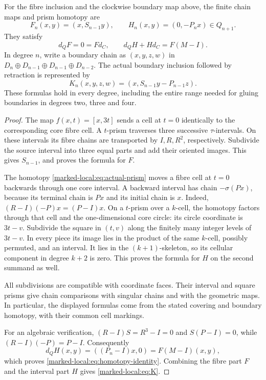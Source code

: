 \begin{theorem}\label{marked-local:thm:maps}
For the fibre inclusion and the clockwise boundary map above, the finite
chain maps and prism homotopy are
\begin{equation}\label{marked-local:eq:F-H}
 F_n(x,y)=(x,S_{n-1}y),\qquad
 H_n(x,y)=(0,-P_nx)\in Q_{n+1}.
\end{equation}
They satisfy
\begin{equation}\label{marked-local:eq:homotopy-identity}
 d_QF=0=Fd_C,\qquad d_QH+Hd_C=F(M-I).
\end{equation}
In degree $n$, write a boundary chain as
$(x,y,z,w)$ in
$D_n\oplus D_{n-1}\oplus D_{n-1}\oplus D_{n-2}$.
The actual boundary inclusion followed by retraction is represented by
\begin{equation}\label{marked-local:eq:K}
 K_n(x,y,z,w)=(x,S_{n-1}y-P_{n-1}z).
\end{equation}
These formulas hold in every degree, including the entire range needed
for gluing boundaries in degrees two, three and four.
\end{theorem}
\begin{proof}
The map $f(x,t)=[x,3t]$ sends a cell at $t=0$ identically to the
corresponding core fibre cell. A $t$-prism traverses three successive
$\tau$-intervals. On these intervals its fibre chains are transported
by $I,R,R^2$, respectively. Subdivide the source interval into three
equal parts and add their oriented images. This gives $S_{n-1}$,
and proves the formula for $F$.

The homotopy \eqref{marked-local:eq:actual-prism} moves a fibre cell at $t=0$
backwards through one core interval. A backward interval has chain
$-\sigma(Px)$, because its terminal chain is $Px$ and its initial
chain is $x$. Indeed,
$(R-I)(-P)x=(P-I)x$. On a $t$-prism over a $k$-cell, the
homotopy factors through that cell and the one-dimensional core circle:
its circle coordinate is $3t-v$. Subdivide the square in $(t,v)$
along the finitely many integer levels of $3t-v$. In every piece its
image lies in the product of the same $k$-cell, possibly permuted,
and an interval. It lies in the $(k+1)$-skeleton, so its cellular
component in degree $k+2$ is zero. This proves the formula for $H$
on the second summand as well.

All subdivisions are compatible with coordinate faces. Their interval
and square prisms give chain comparisons with singular chains and
with the geometric maps. In particular, the displayed formulas come
from the stated covering and boundary homotopy, with their common
cell markings.

For an algebraic verification, $(R-I)S=R^3-I=0$ and
$S(P-I)=0$, while $(R-I)(-P)=P-I$. Consequently
\[
 d_QH(x,y)=((P_n-I)x,0)=F(M-I)(x,y),
\]
which proves \eqref{marked-local:eq:homotopy-identity}. Combining the fibre part
$F$ and the interval part $H$ gives \eqref{marked-local:eq:K}.
\end{proof}

